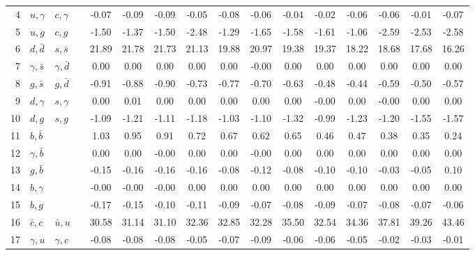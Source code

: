 \begin{tabularx}{\textwidth}{rXXX@{}S@{}S@{}S@{}S@{}S@{}S@{}S@{}S@{}S@{}S@{}S@{}S}
  4 & $u,\gamma$       & $c,\gamma$       &                 & -0.07 & -0.09 & -0.09 & -0.05 & -0.08 & -0.06 & -0.04 & -0.02 & -0.06 & -0.06 & -0.01 & -0.07 \\
  5 & $u,g$            & $c,g$            &                 & -1.50 & -1.37 & -1.50 & -2.48 & -1.29 & -1.65 & -1.58 & -1.61 & -1.06 & -2.59 & -2.53 & -2.58 \\
  6 & $d,\bar d$       & $s,\bar s$       &                 & 21.89 & 21.78 & 21.73 & 21.13 & 19.88 & 20.97 & 19.38 & 19.37 & 18.22 & 18.68 & 17.68 & 16.26 \\
  7 & $\gamma, \bar s$ & $\gamma, \bar d$ &                 &  0.00 &  0.00 &  0.00 &  0.00 &  0.00 & -0.00 &  0.00 &  0.00 &  0.00 &  0.00 &  0.00 &  0.00 \\
  8 & $g,\bar s$       & $g,\bar d$       &                 & -0.91 & -0.88 & -0.90 & -0.73 & -0.77 & -0.70 & -0.63 & -0.48 & -0.44 & -0.59 & -0.50 & -0.57 \\
  9 & $d,\gamma$       & $s,\gamma$       &                 &  0.00 &  0.01 &  0.00 &  0.00 &  0.00 &  0.00 &  0.00 & -0.00 &  0.00 & -0.00 &  0.00 &  0.00 \\
 10 & $d,g$            & $s,g$            &                 & -1.09 & -1.21 & -1.11 & -1.18 & -1.03 & -1.10 & -1.32 & -0.99 & -1.23 & -1.20 & -1.55 & -1.57 \\
 11 & $b,\bar b$       &                  &                 &  1.03 &  0.95 &  0.91 &  0.72 &  0.67 &  0.62 &  0.65 &  0.46 &  0.47 &  0.38 &  0.35 &  0.24 \\
 12 & $\gamma,\bar b$  &                  &                 &  0.00 &  0.00 & -0.00 &  0.00 &  0.00 & -0.00 &  0.00 &  0.00 &  0.00 &  0.00 &  0.00 &  0.00 \\
 13 & $g,\bar b$       &                  &                 & -0.15 & -0.16 & -0.16 & -0.16 & -0.08 & -0.12 & -0.08 & -0.10 & -0.10 & -0.03 & -0.05 &  0.10 \\
 14 & $b,\gamma$       &                  &                 & -0.00 & -0.00 & -0.00 &  0.00 &  0.00 &  0.00 &  0.00 &  0.00 &  0.00 &  0.00 &  0.00 &  0.00 \\
 15 & $b,g$            &                  &                 & -0.17 & -0.15 & -0.10 & -0.11 & -0.09 & -0.07 & -0.08 & -0.09 & -0.07 & -0.08 & -0.07 & -0.06 \\
 16 & $\bar c,c$       & $\bar u,u$       &                 & 30.58 & 31.14 & 31.10 & 32.36 & 32.85 & 32.28 & 35.50 & 32.54 & 34.36 & 37.81 & 39.26 & 43.46 \\
 17 & $\gamma, u$      & $\gamma, c$      &                 & -0.08 & -0.08 & -0.08 & -0.05 & -0.07 & -0.09 & -0.06 & -0.06 & -0.05 & -0.02 & -0.03 & -0.01 \\

\end{tabularx}

